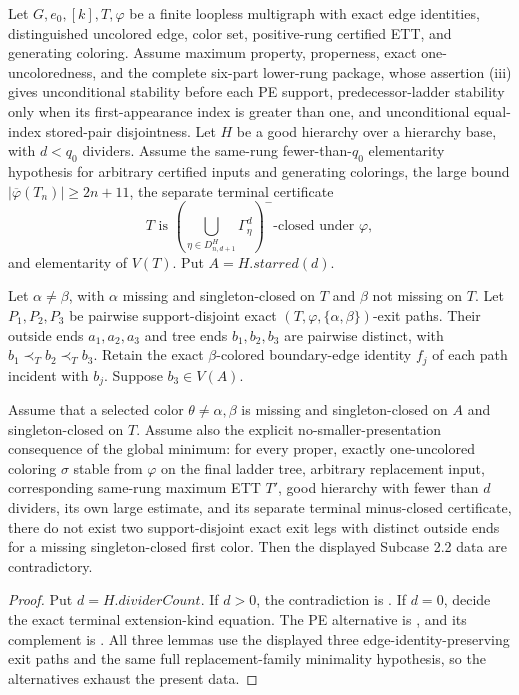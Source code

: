\begin{lemma}
Let $G,e_0,[k],T,\varphi$ be a finite loopless multigraph with exact edge
identities, distinguished uncolored edge, color set, positive-rung
certified ETT, and generating coloring.  Assume maximum property,
properness, exact one-uncoloredness, and the complete six-part lower-rung
package, whose assertion (iii) gives unconditional stability before each PE
support, predecessor-ladder stability only when its first-appearance index is
greater than one, and unconditional equal-index stored-pair disjointness.  Let $H$ be a good hierarchy over a hierarchy base, with
$d<q_0$ dividers.  Assume the same-rung fewer-than-$q_0$ elementarity
hypothesis for arbitrary certified inputs and generating colorings, the
large bound $|\overline\varphi(T_n)|\geq2n+11$, the separate terminal
certificate
\[
 T\text{ is }
 \left(\bigcup_{\eta\in D^H_{n,d+1}}\Gamma^d_\eta\right)^-
 \text{-closed under }\varphi,
\]
and elementarity of $V(T)$.  Put $A=H.\mathit{starred}(d)$.

Let $\alpha\ne\beta$, with $\alpha$ missing and singleton-closed on $T$
and $\beta$ not missing on $T$.  Let $P_1,P_2,P_3$ be pairwise
support-disjoint exact $(T,\varphi,\{\alpha,\beta\})$-exit paths.  Their
outside ends $a_1,a_2,a_3$ and tree ends $b_1,b_2,b_3$ are pairwise
distinct, with $b_1\prec_T b_2\prec_T b_3$.  Retain the exact
$\beta$-colored boundary-edge identity $f_j$ of each path incident with
$b_j$.  Suppose $b_3\in V(A)$.

Assume that a selected color $\theta\ne\alpha,\beta$ is missing and
singleton-closed on $A$ and singleton-closed on $T$.  Assume also the
explicit no-smaller-presentation consequence of the global minimum: for
every proper, exactly one-uncolored coloring $\sigma$ stable from
$\varphi$ on the final ladder tree, arbitrary replacement input,
corresponding same-rung maximum ETT $T'$, good hierarchy with fewer than
$d$ dividers, its own large estimate, and its separate terminal
minus-closed certificate, there do not exist two support-disjoint exact
exit legs with distinct outside ends for a missing singleton-closed first
color.  Then the displayed Subcase 2.2 data are contradictory.
\end{lemma}
\begin{proof}
Put $d=H.\mathit{dividerCount}$.  If $d>0$, the contradiction is
.  If $d=0$, decide the exact
terminal extension-kind equation.  The PE alternative is
, and its complement is
.  All three lemmas use the displayed
three edge-identity-preserving exit paths and the same full replacement-family
minimality hypothesis, so the alternatives exhaust the present data.
\end{proof}
